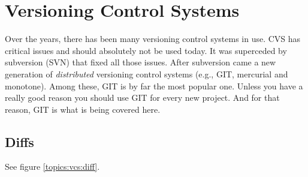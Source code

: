 \section{Versioning Control Systems}


Over the years, there has been many versioning control systems in use. CVS has critical issues and should absolutely not be used today. It was superceded by subversion (SVN) that fixed all those issues. After subversion came a new generation of \textsl{distributed} versioning control systems (e.g., GIT, mercurial and monotone). Among these, GIT is by far the most popular one. Unless you have a really good reason you should use GIT for every new project. And for that reason, GIT is what is being covered here.

\subsection{Diffs}

See figure \ref{topics:vcs:diff}.

